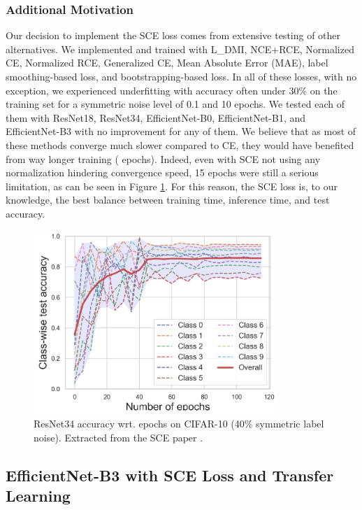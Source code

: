 \documentclass[11pt,twocolumn,letterpaper]{article}
\begin{document}
\subsubsection*{Additional Motivation}
Our decision to implement the SCE loss comes from extensive testing of other alternatives. We implemented and trained with L\_DMI, NCE+RCE, Normalized CE, Normalized RCE, Generalized CE, Mean Absolute Error (MAE), label smoothing-based loss, and bootstrapping-based loss. In all of these losses, with no exception, we experienced underfitting with accuracy often under 30\% on the training set for a symmetric noise level of 0.1 and 10 epochs. We tested each of them with ResNet18, ResNet34, EfficientNet-B0, EfficientNet-B1, and EfficientNet-B3 with no improvement for any of them. We believe that as most of these methods converge much slower compared to CE, they would have benefited from way longer training ( epochs). Indeed, even with SCE not using any normalization hindering convergence speed, 15 epochs were still a serious limitation, as can be seen in Figure \ref{fig:convergence}. For this reason, the SCE loss is, to our knowledge, the best balance between training time, inference time, and test accuracy.

\begin{figure}
    \centering
    \includegraphics[width=1\linewidth]{convergence.png}
    \caption{ResNet34 accuracy wrt. epochs on CIFAR-10 (40\% symmetric label noise). Extracted from the SCE paper \cite{wangSymmetricCrossEntropy2019}.}
    \label{fig:convergence}
\end{figure}


\subsection{EfficientNet-B3 with SCE Loss and Transfer Learning}
\end{document}
